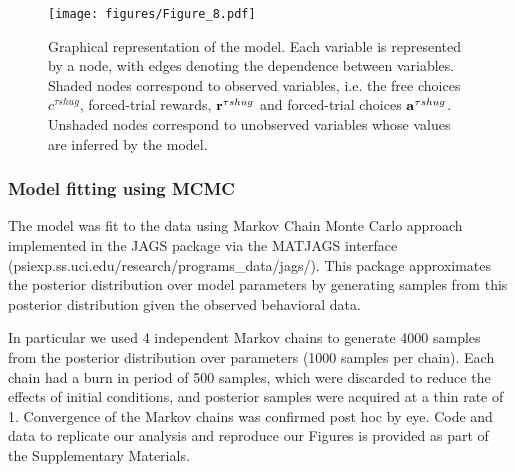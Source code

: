 \documentclass[12pt]{article}
\begin{document}

\begin{figure}[tp]
\begin{center}
		\texttt{[image: figures/Figure\_8.pdf]}
\caption{Graphical representation of the model.  Each variable is represented by a node, with edges denoting the dependence between variables.  Shaded nodes correspond to observed variables, i.e. the free choices $c^{\tau shug}$, forced-trial rewards, ${\bf r}^{\tau shug}$ and forced-trial choices ${\bf a}^{\tau shug}$. Unshaded nodes correspond to unobserved variables whose values are inferred by the model. }
\label{fig:graphicalModel}
\end{center}
\end{figure}



 

\subsubsection*{Model fitting using MCMC}
The model was fit to the data using Markov Chain Monte Carlo approach implemented in the JAGS package \cite{plummer2003jags} via the MATJAGS interface (psiexp.ss.uci.edu/research/programs\_data/jags/).  This package approximates the posterior distribution over model parameters by generating samples from this posterior distribution given the observed behavioral data.  

In particular we used 4 independent Markov chains to generate 4000 samples from the posterior distribution over parameters (1000 samples per chain).  Each chain had a burn in period of 500 samples, which were discarded to reduce the effects of initial conditions, and posterior samples were acquired at a thin rate of 1.  Convergence of the Markov chains was confirmed post hoc by eye. Code and data to replicate our analysis and reproduce our Figures is provided as part of the Supplementary Materials.





\end{document}
